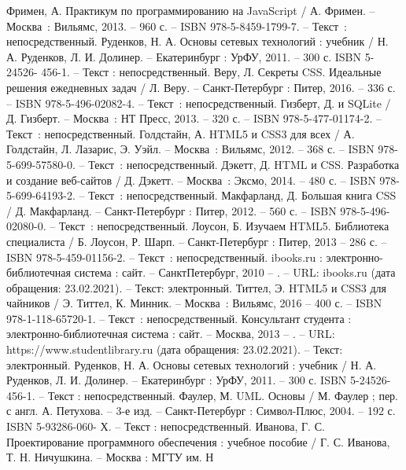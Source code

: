 
\begin{thebibliography}{9}

     Фримен, А. Практикум по программированию на JavaScript / А. Фримен. – Москва~: Вильямс, 2013. – 960 с. – ISBN 978-5-8459-1799-7. – Текст~: непосредственный.
     Руденков, Н. А. Основы сетевых технологий : учебник / Н. А. Руденков, Л. И. Долинер. – Екатеринбург : УрФУ, 2011. – 300 с. ISBN 5-24526- 456-1. – Текст : непосредственный.
     Веру, Л. Секреты CSS. Идеальные решения ежедневных задач / Л. Веру. – Санкт-Петербург : Питер, 2016. – 336 с. – ISBN 978-5-496-02082-4. – Текст~: непосредственный.
    	Гизберт, Д.  и SQLite / Д. Гизберт. – Москва~: НТ Пресс, 2013. – 320 с. – ISBN 978-5-477-01174-2. – Текст~: непосредственный.
		Голдстайн, А. HTML5 и CSS3 для всех / А. Голдстайн, Л. Лазарис, Э. Уэйл. – Москва~: Вильямс, 2012. – 368 с. – ISBN 978-5-699-57580-0. – Текст~: непосредственный.
		Дэкетт, Д. HTML и CSS. Разработка и создание веб-сайтов / Д. Дэкетт. – Москва~: Эксмо, 2014. – 480 с. – ISBN 978-5-699-64193-2. – Текст~: непосредственный.
		Макфарланд, Д. Большая книга CSS / Д. Макфарланд. – Санкт-Петербург : Питер, 2012. – 560 с. – ISBN 978-5-496-02080-0. – Текст~: непосредственный.
		Лоусон, Б. Изучаем HTML5. Библиотека специалиста / Б. Лоусон, Р. Шарп. – Санкт-Петербург : Питер, 2013 – 286 с. – ISBN 978-5-459-01156-2. – Текст~: непосредственный.
		ibooks.ru : электронно-библиотечная система : сайт. – СанктПетербург, 2010 – . – URL: ibooks.ru (дата обращения: 23.02.2021). – Текст: электронный.    
		Титтел, Э. HTML5 и CSS3 для чайников / Э. Титтел, К. Минник. – Москва~: Вильямс, 2016 – 400 с. – ISBN 978-1-118-65720-1. – Текст~: непосредственный.    
		Консультант студента : электронно-библиотечная система : сайт. – Москва, 2013 – . – URL: https://www.studentlibrary.ru (дата обращения: 23.02.2021). – Текст: электронный.  
		Руденков, Н. А. Основы сетевых технологий : учебник / Н. А. Руденков, Л. И. Долинер. – Екатеринбург : УрФУ, 2011. – 300 с. ISBN 5-24526-
	456-1. – Текст : непосредственный.   
		Фаулер, М. UML. Основы / М. Фаулер ; пер. с англ. А. Петухова. – 3-е изд. – Санкт-Петербург : Символ-Плюс, 2004. – 192 с. ISBN 5-93286-060- Х. – Текст : непосредственный.
		Иванова, Г. С. Проектирование программного обеспечения : учебное пособие / Г. С. Иванова, Т. Н. Ничушкина. – Москва : МГТУ им. Н

\end{thebibliography}
